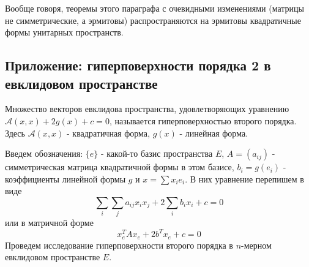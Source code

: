 Вообще говоря, теоремы этого параграфа с очевидными изменениями (матрицы не
симметрические, а эрмитовы) распространяются на эрмитовы квадратичные формы
унитарных пространств. 

\subsection{Приложение: гиперповерхности порядка 2 в евклидовом пространстве}
\begin{defin}
Множество векторов евклидова пространства, удовлетворяющих уравнению 
$\mathcal A(x,x)+2g(x)+c=0$, называется гиперповерхностью второго порядка.
Здесь $\mathcal A(x,x)$ - квадратичная форма, $g(x)$ - линейная форма.
\end{defin}
Введем обозначения: $\{e\}$ - какой-то базис пространства $E$, $A=(a_{ij})$
- симметрическая матрица квадратичной формы в этом базисе, $b_i=g(e_i)$ -
коэффициенты линейной формы $g$ и $x=\sum x_ie_i$. В них уравнение перепишем
в виде
$$\sum_i\sum_ja_{ij}x_ix_j+2\sum_i b_ix_i+c=0$$
или в матричной форме $$x^T_eAx_e+2b^Tx_e+c=0$$
Проведем исследование гиперповерхности второго порядка в $n$-мерном 
евклидовом пространстве $E$. 

